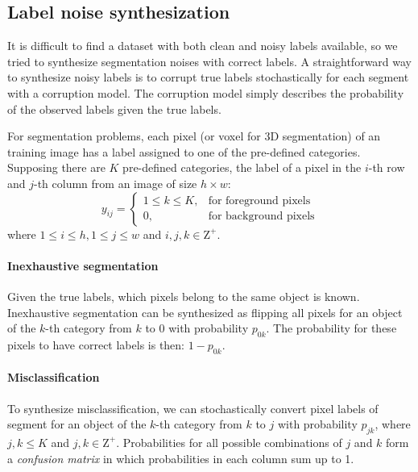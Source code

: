 \subsection{Label noise synthesization}
\label{subsec:noises}

It is difficult to find a dataset with both clean and noisy labels available, so we tried to synthesize segmentation noises with correct labels.
A straightforward way to synthesize noisy labels is to corrupt true labels stochastically for each segment with a corruption model.
The corruption model simply describes the probability of the observed labels given the true labels.

For segmentation problems, each pixel (or voxel for 3D segmentation) of an training image has a label assigned to one of the pre-defined categories.
Supposing there are $K$ pre-defined categories, the label of a pixel in the $i$-th row and $j$-th column from an image of size $h \times w$:
\[
  y_{ij} =
    \begin{cases}
      1 \leq k \leq K, & \text{for foreground pixels} \\
      0, & \text{for background pixels}
    \end{cases}
\]
where $1 \leq i \leq h, 1 \leq j \leq w$ and $i,j,k \in \mathrm{Z}^+$.


\paragraph{Inexhaustive segmentation}
Given the true labels, which pixels belong to the same object is known.
Inexhaustive segmentation can be synthesized as flipping all pixels for an object of the $k$-th category from $k$ to $0$ with probability $p_{0k}$.
The probability for these pixels to have correct labels is then: $1-p_{0k}$.


\paragraph{Misclassification}
To synthesize misclassification, we can stochastically convert pixel labels of segment for an object of the $k$-th category from $k$ to $j$ with probability $p_{jk}$, where $j, k \leq K$ and $j,k \in \mathrm{Z}^+$.
Probabilities for all possible combinations of $j$ and $k$ form a \textit{confusion matrix} in which probabilities in each column sum up to 1.

